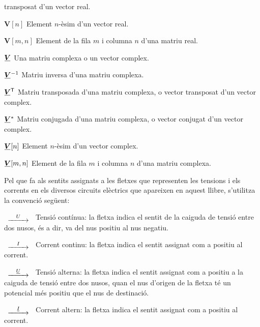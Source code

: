 \begin{list}{}
    transposat d'un vector real.
    \item[$\boldsymbol{V}{[n]}$] Element $n$-èsim d'un vector real.
    \item[$\boldsymbol{V}{[m,n]}$] Element de la fila $m$ i columna $n$ d'una matriu real.
    \item[$\mcmplx{V}$] Una matriu complexa o un vector complex.
    \item[$\mcmplx{V}^{-1}$] Matriu inversa d'una matriu complexa.
    \item[$\transpose{\mcmplx{V}}$] Matriu transposada d'una matriu complexa, o vector
    transposat d'un vector complex.
    \item[$\mcmplx{V}^*$] Matriu conjugada d'una matriu complexa, o vector
    conjugat d'un vector complex.
    \item[$\mcmplx{V}{[n]}$] Element $n$-èsim d'un vector complex.
    \item[$\mcmplx{V}{[m,n]}$] Element de la fila $m$ i columna $n$ d'una matriu complexa.
\end{list}

Pel que fa als sentits assignats a les fletxes que representen les
tensions i els corrents en els diversos circuits elèctrics que
apareixen en aquest llibre, s'utilitza la convenció següent:

\begin{list}{}
{\setlength{\labelwidth}{15mm} \setlength{\leftmargin}{20mm}
\setlength{\labelsep}{5mm}}
    \item[$\begin{CD} @>U>> \end{CD}$] Tensió contínua: la fletxa indica el sentit
    de la caiguda de tensió entre dos nusos, és a dir, va del nus positiu al nus negatiu.
    \item[$\begin{CD} @>I>> \end{CD}$] Corrent
    continu: la fletxa indica el sentit  assignat com a positiu al corrent.
    \item[$\begin{CD} @>\cmplx{U}>> \end{CD}$] Tensió alterna: la fletxa indica el
    sentit assignat com a positiu a la caiguda de tensió entre dos nusos, quan el nus d'origen de la fletxa
    té un potencial  més positiu que el nus de destinació.
    \item[$\begin{CD} @>\cmplx{I}>> \end{CD}$] Corrent altern: la fletxa
    indica el sentit  assignat com a positiu al corrent.
\end{list}

